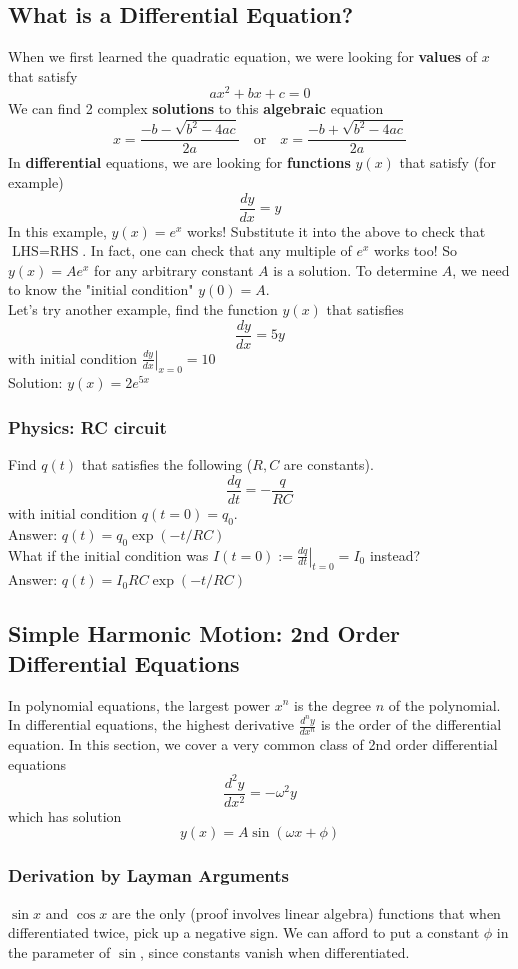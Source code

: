 \documentclass{article}
\begin{document}
\subsection{What is a Differential Equation?}
When we first learned the quadratic equation, we were looking for \textbf{values} of $x$ that satisfy $$ax^2 + bx + c = 0$$  We can find 2 complex \textbf{solutions} to this \textbf{algebraic} equation
$$x = \frac{-b - \sqrt{b^2 - 4ac}}{2a} \quad \text{or}\quad x = \frac{-b + \sqrt{b^2 - 4ac}}{2a}$$
In \textbf{differential} equations, we are looking for \textbf{functions} $y(x)$ that satisfy (for example)
$$\frac{dy}{dx} = y$$
In this example, $y(x) = e^x$ works! Substitute it into the above to check that $\text{LHS} = \text{RHS}$. In fact, one can check that any multiple of $e^x$ works too! So $y(x) = A e^x$ for any arbitrary constant $A$ is a solution. To determine $A$, we need to know the "initial condition" $y(0) = A$.
\\[10pt]
Let's try another example, find the function $y(x)$ that satisfies 
$$\frac{dy}{dx} = 5y$$ with initial condition $\left. \frac{dy}{dx} \right|_{x=0} = 10$\\
Solution: $y(x) = 2e^{5x}$
\subsubsection{Physics: RC circuit} 
Find $q(t)$ that satisfies the following ($R,C$ are constants).
$$\frac{dq}{dt} = -\frac{q}{RC}$$ with initial condition $q(t=0) = q_0$. \\Answer: $q(t) = q_0 \exp (-t/RC)$ \\[10pt]
What if the initial condition was $I(t=0) := \left. \frac{dq}{dt} \right|_{t=0} = I_0$ instead? \\ Answer: $q(t) = {I_0 RC} \exp (-t/RC)$\\[10pt]

\subsection{Simple Harmonic Motion: 2nd Order Differential Equations}
In polynomial equations, the largest power $x^n$ is the degree $n$ of the polynomial. In differential equations, the highest derivative $\frac{d^n y}{dx^n}$ is the order of the differential equation. In this section, we cover a very common class of 2nd order differential equations
$$\frac{d^2 y}{dx^2} = -\omega^2 y$$
which has solution
$$y(x) = A\sin(\omega x + \phi)$$
\subsubsection{Derivation by Layman Arguments}
$\sin x$ and $\cos x$ are the only (proof involves linear algebra) functions that when differentiated twice, pick up a negative sign. We can afford to put a constant $\phi$ in the parameter of $\sin$, since constants vanish when differentiated. 
\end{document}
